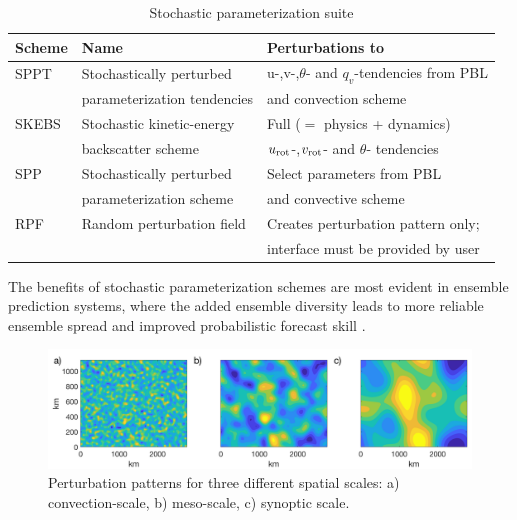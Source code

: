 \begin{table}[h!]
\label{stoch_table}
\begin{center}
\caption{Stochastic parameterization suite}
\begin{tabular}{ | l | l | l |}
\hline
Scheme          & Name & Perturbations to \\ 
\hline
SPPT  & Stochastically perturbed    &  u-,v-,$\theta$- and $q_v$-tendencies from PBL\\
      & parameterization tendencies &  and convection scheme\\  \hline

SKEBS & Stochastic kinetic-energy   &  Full ($=$ physics + dynamics) \\
      & backscatter scheme          &  $u_{\rm rot}$-,$v_{\rm rot}$- and $\theta$- tendencies\\  \hline

SPP & Stochastically perturbed      &  Select parameters from PBL \\
    & parameterization scheme       &  and convective scheme\\  \hline

RPF & Random perturbation field     &  Creates perturbation pattern only;  \\
    &                               &  interface must be provided by user\\
\hline
\end{tabular}
\end{center}
\end{table}

The benefits of stochastic parameterization schemes are most evident in ensemble 
prediction systems, where the added ensemble diversity leads to more reliable 
ensemble spread and improved probabilistic forecast skill \citep[e.g.][]{Be15}.

\begin{figure}[h!]
  \includegraphics[width=6.5in]{figures/stoch_pattern.png}
    \caption{Perturbation patterns for three different spatial scales: 
     a) convection-scale, b) meso-scale, c) synoptic scale.}
  \label{stoch_pattern}
\end{figure}



